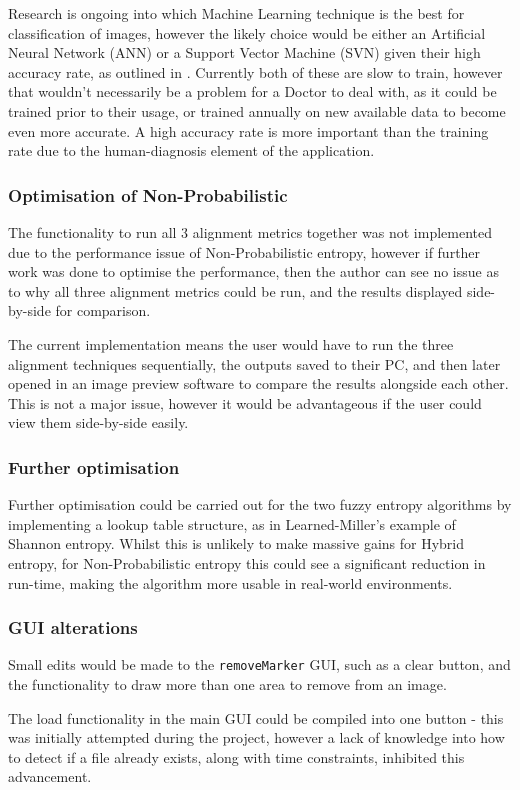 Research is ongoing into which Machine Learning technique is the best for classification of images, however the likely choice would be either an Artificial Neural Network (ANN) or a Support Vector Machine (SVN) given their high accuracy rate, as outlined in \cite{kotsiantis2007supervised}. Currently both of these are slow to train, however that wouldn't necessarily be a problem for a Doctor to deal with, as it could be trained prior to their usage, or trained annually on new available data to become even more accurate. A high accuracy rate is more important than the training rate due to the human-diagnosis element of the application.

\subsubsection{Optimisation of Non-Probabilistic}

The functionality to run all 3 alignment metrics together was not implemented due to the performance issue of Non-Probabilistic entropy, however if further work was done to optimise the performance, then the author can see no issue as to why all three alignment metrics could be run, and the results displayed side-by-side for comparison.

The current implementation means the user would have to run the three alignment techniques sequentially, the outputs saved to their PC, and then later opened in an image preview software to compare the results alongside each other. This is not a major issue, however it would be advantageous if the user could view them side-by-side easily.

\subsubsection{Further optimisation}

Further optimisation could be carried out for the two fuzzy entropy algorithms by implementing a lookup table structure, as in Learned-Miller's example of Shannon entropy. Whilst this is unlikely to make massive gains for Hybrid entropy, for Non-Probabilistic entropy this could see a significant reduction in run-time, making the algorithm more usable in real-world environments.

\subsubsection{GUI alterations}

Small edits would be made to the \texttt{removeMarker} \acrshort{GUI}, such as a clear button, and the functionality to draw more than one area to remove from an image.

The load functionality in the main \acrshort{GUI} could be compiled into one button - this was initially attempted during the project, however a lack of knowledge into how to detect if a file already exists, along with time constraints, inhibited this advancement.
